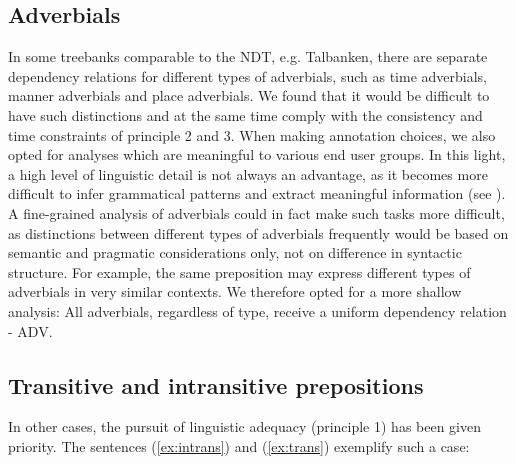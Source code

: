 \documentclass[10pt,a4paper]{article}
\begin{document}
\subsection{Adverbials}
In some treebanks comparable to the NDT, e.g. Talbanken, there are separate dependency relations for different types of adverbials, such as time adverbials, manner adverbials and place adverbials. 
We found that it would be difficult to have such distinctions and at the same time comply with the consistency and time constraints of principle 2 and 3. %
When making annotation choices, we also opted for analyses which are meaningful to various end user groups.
In this light, a high level of linguistic detail is not always an advantage, as it becomes more difficult to infer grammatical patterns and extract meaningful information (see ).
A fine-grained analysis of adverbials could in fact make such tasks more difficult, as distinctions between different types of adverbials frequently would be based on semantic and pragmatic considerations only, not on difference in syntactic structure.
For example, the same preposition may express different types of adverbials in very similar contexts.
We therefore opted for a more shallow analysis:
All adverbials, regardless of type,
receive a uniform dependency relation - ADV. 

\subsection{Transitive and intransitive prepositions}
In other cases, the pursuit of linguistic adequacy (principle 1) has been given priority. The sentences (\ref{ex:intrans}) and (\ref{ex:trans}) exemplify such a case:
\end{document}
